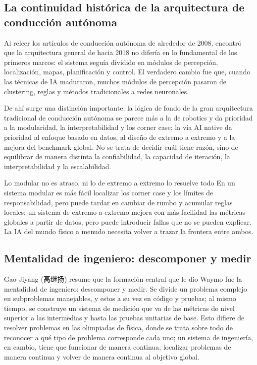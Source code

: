 \documentclass[a4paper]{article}
\begin{document}
\subsection{La continuidad histórica de la arquitectura de conducción autónoma}

Al releer los artículos de conducción autónoma de alrededor de 2008, encontró que la arquitectura general de hacia 2018 no difería en lo fundamental de los primeros marcos: el sistema seguía dividido en módulos de percepción, localización, mapas, planificación y control. El verdadero cambio fue que, cuando las técnicas de IA maduraron, muchos módulos de percepción pasaron de clustering, reglas y métodos tradicionales a redes neuronales.

De ahí surge una distinción importante: la lógica de fondo de la gran arquitectura tradicional de conducción autónoma se parece más a la de robotics y da prioridad a la modularidad, la interpretabilidad y los corner case; la vía AI native da prioridad al enfoque basado en datos, al diseño de extremo a extremo y a la mejora del benchmark global. No se trata de decidir cuál tiene razón, sino de equilibrar de manera distinta la confiabilidad, la capacidad de iteración, la interpretabilidad y la escalabilidad.

\begin{warningbox}{Lo modular no es atraso, ni lo de extremo a extremo lo resuelve todo}
En un sistema modular es más fácil localizar los corner case y los límites de responsabilidad, pero puede tardar en cambiar de rumbo y acumular reglas locales; un sistema de extremo a extremo mejora con más facilidad las métricas globales a partir de datos, pero puede introducir fallas que no se pueden explicar. La IA del mundo físico a menudo necesita volver a trazar la frontera entre ambos.
\end{warningbox}

\subsection{Mentalidad de ingeniero: descomponer y medir}

Gao Jiyang (高继扬) resume que la formación central que le dio Waymo fue la mentalidad de ingeniero: descomponer y medir. Se divide un problema complejo en subproblemas manejables, y estos a su vez en código y pruebas; al mismo tiempo, se construye un sistema de medición que va de las métricas de nivel superior a las intermedias y hasta las pruebas unitarias de base. Esto difiere de resolver problemas en las olimpiadas de física, donde se trata sobre todo de reconocer a qué tipo de problema corresponde cada uno; un sistema de ingeniería, en cambio, tiene que funcionar de manera continua, localizar problemas de manera continua y volver de manera continua al objetivo global.
\end{document}
